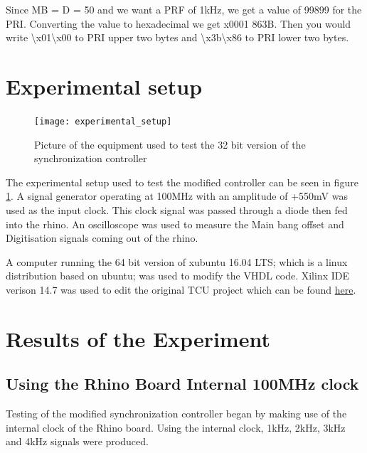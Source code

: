 \documentclass[12pt, a4paper]{article}
\begin{document}
Since MB = D = 50 and we want a PRF of 1kHz, we get a value of 99899 for the PRI. Converting the value to hexadecimal we get x0001 863B. Then you would write \textbackslash x01\textbackslash x00 to PRI upper two bytes and \textbackslash x3b\textbackslash x86 to PRI lower two bytes.

\section{Experimental setup}

	\begin{figure}[h]
		\centering
		\texttt{[image: experimental\_setup]}
		\caption{Picture of the equipment used to test the 32 bit version of the synchronization controller}
		\label{fig:exp_setup}
	\end{figure}
	

The experimental setup used to test the modified controller can be seen in figure \ref{fig:exp_setup}. A signal generator operating at 100MHz with an amplitude of +550mV was used as the input clock. This clock signal was passed through a diode then fed into the rhino. An oscilloscope was used to measure the Main bang offset and Digitisation signals coming out of the rhino. 

A computer running the 64 bit version of xubuntu 16.04 LTS; which is a linux distribution based on ubuntu; was used to modify the VHDL code. Xilinx IDE verison 14.7 was used to edit the original TCU  project which can be found \href{https://github.com/Skippy01/NeXtRAD-TCU/tree/master/NeXtRAD-TCU-Controller}{here}.



\section{Results of the Experiment}

\subsection{Using the Rhino Board Internal 100MHz clock}

Testing of the modified synchronization controller began by making use of the internal clock of the Rhino board. Using the internal clock, 1kHz, 2kHz, 3kHz and 4kHz signals were produced. 
\end{document}
